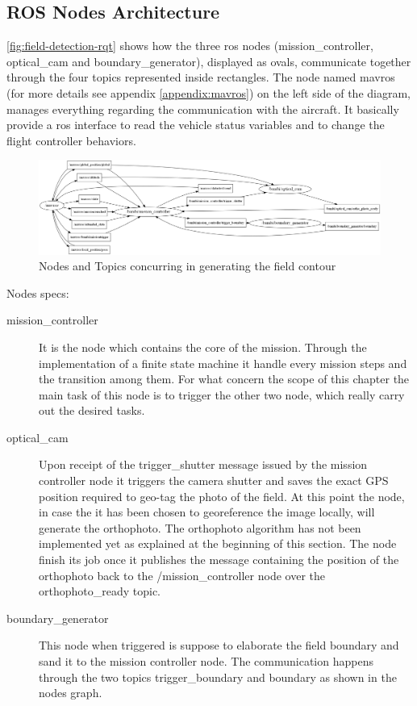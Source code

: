 \subsection{ROS Nodes Architecture} %
\label{sub:ros_nodes}
\autoref{fig:field-detection-rqt} shows how the three \acrshort{ros} nodes (\textsf{mission\_controller}, \textsf{optical\_cam} and \textsf{boundary\_generator}), displayed as ovals, communicate together through the four topics represented inside rectangles. The node named \textsf{mavros} (for more details see appendix \ref{appendix:mavros}) on the left side of the diagram, manages everything regarding the communication with the aircraft. It basically provide a \acrshort{ros} interface to read the vehicle status variables and to change the flight controller behaviors.\par
\begin{figure}[ht]
    \centering
    \includegraphics[width=1.1\textwidth]{figures/C2/rosgraph-ortho.png}
    \caption{Nodes and Topics concurring in generating the field contour}
    \label{fig:field-detection-rqt}
\end{figure}
Nodes specs:
\begin{description}
	\item[\textsf{mission\_controller}] It is the node which contains the core of the mission. Through the implementation of a finite state machine it handle every mission steps and the transition among them. For what concern the scope of this chapter the main task of this node is to trigger the other two node, which really carry out the desired tasks.
	\item[\textsf{optical\_cam}] Upon receipt of the \textsf{trigger\_shutter} message issued by the mission controller node it triggers the camera shutter and saves the exact GPS position required to geo-tag the photo of the field.
	At this point the node, in case the it has been chosen to georeference the image locally, will generate the orthophoto. The orthophoto algorithm has not been implemented yet as explained at the beginning of this section.
	The node finish its job once it publishes the message containing the position of the orthophoto back to the \textsf{/mission\_controller} node over the \textsf{orthophoto\_ready} topic. 
	\item[\textsf{boundary\_generator}] This node when triggered is suppose to elaborate the field boundary and sand it to the mission controller node. The communication happens through the two topics \textsf{trigger\_boundary} and \textsf{boundary} as shown in the nodes graph.
\end{description}
